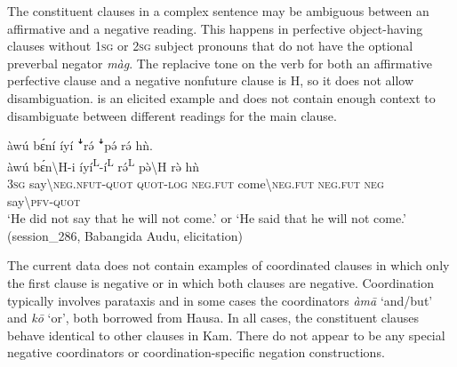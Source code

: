\documentclass[output=paper,colorlinks,citecolor=brown]{langscibook}
\begin{document}
The constituent clauses in a complex sentence may be ambiguous between an affirmative and a negative reading. This happens in perfective object-having clauses without 1\textsc{sg} or 2\textsc{sg} subject pronouns that do not have the optional preverbal negator \textit{màg}. The replacive tone on the verb for both an affirmative perfective clause and a negative nonfuture clause is H, so it does not allow disambiguation.  is an elicited example and does not contain enough context to disambiguate between different readings for the main clause. 

\ea\label{ex:kam:82} 
    \gllll àwú bɛ́ní íyí ꜜrə́ ꜜpə́ rə́ hǹ.\\
        àwú bɛ́n{\textbackslash}H-i íyí\textsuperscript{L}{}-í\textsuperscript{L} rə́\textsuperscript{L} pə̀{\textbackslash}H rə̀ hǹ\\
        3\textsc{sg} {say{\textbackslash}\textsc{neg.nfut-quot}} \textsc{quot-log} \textsc{neg.fut} come{\textbackslash}\textsc{neg.fut} \textsc{neg.fut} \textsc{neg}\\
        {} {say{\textbackslash}\textsc{pfv}{}-\textsc{quot}} {} {} {} {} {}\\

    \glt ‘He did not say that he will not come.’ or ‘He said that he will not come.’ (session\_286, Babangida Audu, elicitation)
\z




The current data does not contain examples of coordinated clauses in which only the first clause is negative or in which both clauses are negative. Coordination typically involves parataxis and in some cases the coordinators \textit{àmā} ‘and/but’ and \textit{kō} ‘or’, both borrowed from Hausa. In all cases, the constituent clauses behave identical to other clauses in Kam. There do not appear to be any special negative coordinators or coordination-specific negation constructions.
\end{document}
